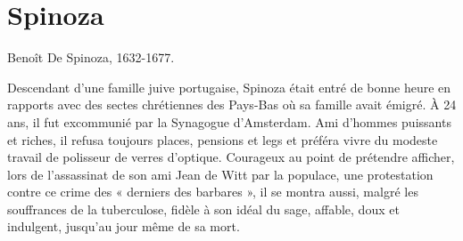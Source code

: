 
\chapter{Spinoza}

 

Benoît De Spinoza, 1632-1677.

Descendant d'une famille juive portugaise,
Spinoza était entré de bonne heure en rapports
avec des sectes chrétiennes des Pays-Bas
où sa famille avait émigré. À 24 ans,
il fut excommunié par la Synagogue
d'Amsterdam. Ami d'hommes puissants et
riches, il refusa toujours places, pensions
et legs et préféra vivre du modeste travail de
polisseur de verres d'optique. Courageux au
point de prétendre afficher, lors de l'assassinat
de son ami Jean de Witt par la populace,
une protestation contre ce crime des
« derniers des barbares », il se montra aussi,
malgré les souffrances de la tuberculose,
fidèle à son idéal du sage, affable, doux et
indulgent, jusqu'au jour même de sa mort.

